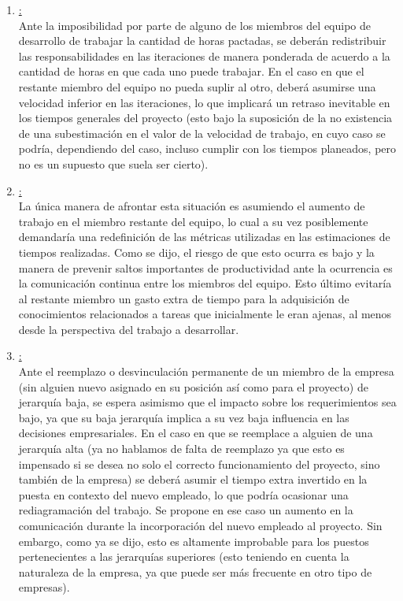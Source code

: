 \documentclass[a4paper, 12pt,twoside]{report}  %
\numberwithin{equation}{subsection} %
\begin{document}
\begin{enumerate}
	\item \underline{:}\\
	Ante la imposibilidad por parte de alguno de los miembros del equipo de desarrollo de trabajar la cantidad de horas pactadas, se deberán redistribuir las responsabilidades en las iteraciones de manera ponderada de acuerdo a la cantidad de horas en que cada uno puede trabajar. En el caso en que el restante miembro del equipo no pueda suplir al otro, deberá asumirse una velocidad inferior en las iteraciones, lo que implicará un retraso inevitable en los tiempos generales del proyecto (esto bajo la suposición de la no existencia de una subestimación en el valor de la velocidad de trabajo, en cuyo caso se podría, dependiendo del caso, incluso cumplir con los tiempos planeados, pero no es un supuesto que suela ser cierto).
	\item \underline{:}\\
	La única manera de afrontar esta situación es asumiendo el aumento de trabajo en el miembro restante del equipo, lo cual a su vez posiblemente demandaría una redefinición de las métricas utilizadas en las estimaciones de tiempos realizadas. Como se dijo, el riesgo de que esto ocurra es bajo y la manera de prevenir saltos importantes de productividad ante la ocurrencia es la comunicación continua entre los miembros del equipo. Esto último evitaría al restante miembro un gasto extra de tiempo para la adquisición de conocimientos relacionados a tareas que inicialmente le eran ajenas, al menos desde la perspectiva del trabajo a desarrollar.
	\item \underline{:}\\
	Ante el reemplazo o desvinculación permanente de un miembro de la empresa (sin alguien nuevo asignado en su posición así como para el proyecto) de jerarquía baja, se espera asimismo que el impacto sobre los requerimientos sea bajo, ya que su baja jerarquía implica a su vez baja influencia en las decisiones empresariales.
	En el caso en que se reemplace a alguien de una jerarquía alta (ya no hablamos de falta de reemplazo ya que esto es impensado si se desea no solo el correcto funcionamiento del proyecto, sino también de la empresa) se deberá asumir el tiempo extra invertido en la puesta en contexto del nuevo empleado, lo que podría ocasionar una rediagramación del trabajo. Se propone en ese caso un aumento en la comunicación durante la incorporación del nuevo empleado al proyecto. Sin embargo, como ya se dijo, esto es altamente improbable para los puestos pertenecientes a las jerarquías superiores (esto teniendo en cuenta la naturaleza de la empresa, ya que puede ser más frecuente en otro tipo de empresas).

\end{enumerate}
\end{document}
